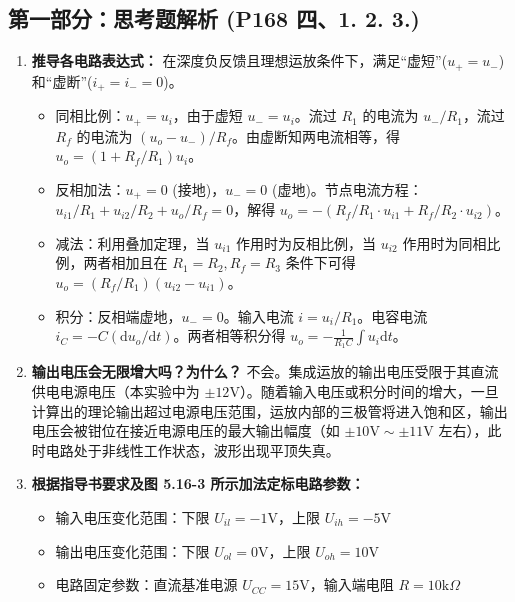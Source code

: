 \documentclass[10.5pt]{config}
\begin{document}
\subsection*{第一部分：思考题解析 (P168 四、1. 2. 3.)}
\begin{enumerate}[label=\arabic*., leftmargin=2em]
    \item \textbf{推导各电路表达式：}
    在深度负反馈且理想运放条件下，满足“虚短”($u_+ = u_-$)和“虚断”($i_+ = i_- = 0$)。
    \begin{itemize}
        \item 同相比例：$u_+ = u_i$，由于虚短 $u_- = u_i$。流过 $R_1$ 的电流为 $u_- / R_1$，流过 $R_f$ 的电流为 $(u_o - u_-) / R_f$。由虚断知两电流相等，得 $u_o = (1 + R_f/R_1)u_i$。
        \item 反相加法：$u_+ = 0$ (接地)，$u_- = 0$ (虚地)。节点电流方程：$u_{i1}/R_1 + u_{i2}/R_2 + u_o/R_f = 0$，解得 $u_o = -(R_f/R_1 \cdot u_{i1} + R_f/R_2 \cdot u_{i2})$。
        \item 减法：利用叠加定理，当 $u_{i1}$ 作用时为反相比例，当 $u_{i2}$ 作用时为同相比例，两者相加且在 $R_1=R_2, R_f=R_3$ 条件下可得 $u_o = (R_f/R_1)(u_{i2}-u_{i1})$。
        \item 积分：反相端虚地，$u_-=0$。输入电流 $i = u_i / R_1$。电容电流 $i_C = - C (\mathrm{d}u_o/\mathrm{d}t)$。两者相等积分得 $u_o = -\frac{1}{R_1 C} \int u_i \mathrm{d}t$。
    \end{itemize}
    \item \textbf{输出电压会无限增大吗？为什么？}
    不会。集成运放的输出电压受限于其直流供电电源电压（本实验中为 $\pm 12\mathrm{V}$）。随着输入电压或积分时间的增大，一旦计算出的理论输出超过电源电压范围，运放内部的三极管将进入饱和区，输出电压会被钳位在接近电源电压的最大输出幅度（如 $\pm 10\mathrm{V} \sim \pm 11\mathrm{V}$ 左右），此时电路处于非线性工作状态，波形出现平顶失真。

\item \textbf{根据指导书要求及图 5.16-3 所示加法定标电路参数：}



\begin{itemize}[leftmargin=2em]
    \item 输入电压变化范围：下限 $U_{il} = -1\mathrm{V}$，上限 $U_{ih} = -5\mathrm{V}$
    \item 输出电压变化范围：下限 $U_{ol} = 0\mathrm{V}$，上限 $U_{oh} = 10\mathrm{V}$
    \item 电路固定参数：直流基准电源 $U_{CC} = 15\mathrm{V}$，输入端电阻 $R = 10\mathrm{k}\Omega$
\end{itemize}



\end{enumerate}
\end{document}

